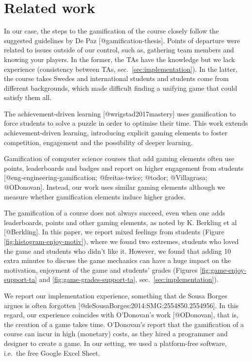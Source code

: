 \documentclass[
]{article}
\begin{document}
\hypertarget{related-work}{%
\section{Related work}\label{related-work}}

In our case, the steps to the gamification of the course closely follow
the suggested guidelines by De Paz {[}@gamification-thesis{]}. Points of
departure were related to issues outside of our control, such as,
gathering team members and knowing your players. In the former, the TAs
have the knowledge but we lack experience (consistency between TAs,
sec.~\ref{sec:implementation}). In the latter, the course takes Swedes
and international students and students come from different backgrounds,
which made difficult finding a unifying game that could satisfy them
all.

The achievement-driven learning {[}@wrigstad2017mastery{]} uses
gamification to force students to solve a puzzle in order to optimise
their time. This work extends achievement-driven learning, introducing
explicit gaming elements to foster competition, engagement and the
possibility of deeper learning.

Gamification of computer science courses that add gaming elements often
use points, leaderboards and badges and report on higher engagement from
students {[}@eng-engineering-gamification; @freitas-twice; @todor;
@Villagrasa; @ODonovan{]}. Instead, our work uses similar gaming
elements although we measure whether gamification elements induce higher
grades.

The gamification of a course does not always succeed, even when one adds
leaderboards, points and other gaming elements, as noted by K. Berkling
et al {[}@Berkling{]}. In this paper, we report mixed feelings from
students (Figure \ref{fig:histogram-enjoy-motiv}), where we found two
extremes, students who loved the game and students who didn't like it.
However, we found that adding 10 extra minutes to discuss the game
mechanics can have a huge impact on the motivation, enjoyment of the
game and students' grades (Figures \ref{fig:game-enjoy-support-ta} and
\ref{fig:game-grades-support-ta}, sec.~\ref{sec:implementation}).

We report our implementation experience, something that de Sousa Borges
argues is often forgotten {[}@deSousaBorges:2014:SMG:2554850.2554956{]}.
In this regard, our experience coincides with O'Donovan's work
{[}@ODonovan{]}, that is, the creation of a game takes time. O'Donovan's
report that the gamification of a course can incur in high (monetary)
costs, as they hired a programmer and designer to create a game. In our
setting, we used a platform-free software, i.e.~the free Google Excel
Sheet.
\end{document}

